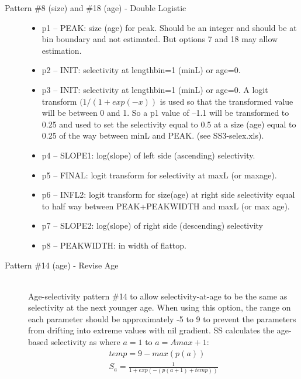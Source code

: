 \begin{description}
	\item[Pattern \#8 (size) and \#18 (age) - Double Logistic]\hfil
	\begin{itemize}
		\item  p1 – PEAK:  size (age) for peak. Should be an integer and should be at bin boundary and not estimated.  But options 7 and 18 may allow estimation.
		\item p2 – INIT:  selectivity at lengthbin=1 (minL) or age=0.
		\item p3 – INIT:  selectivity at lengthbin=1 (minL) or age=0. A logit transform $(1/(1+exp(-x))$ is used so that the transformed value will be between 0 and 1.  So a p1 value of –1.1 will be transformed to 0.25 and used to set the selectivity equal to 0.5 at a size (age) equal to 0.25 of the way between minL and PEAK.  (see SS3-selex.xls).
		\item p4 – SLOPE1:  log(slope) of left side (ascending) selectivity.
		\item p5 – FINAL:  logit transform for selectivity at maxL (or maxage).
		\item p6 – INFL2:  logit transform for size(age) at right side selectivity equal to half way between PEAK+PEAKWIDTH and maxL (or max age).
		\item p7 – SLOPE2:  log(slope) of right side (descending) selectivity
		\item p8 – PEAKWIDTH:  in width of flattop.
	\end{itemize}
\end{description}

\begin{description}
	\item[Pattern \#14 (age) - Revise Age]\hfil\\
	Age-selectivity pattern \#14 to allow selectivity-at-age to be the same as selectivity at the next younger age.  When using this option, the range on each parameter should be approximately -5 to 9 to prevent the parameters from drifting into extreme values with nil gradient. SS calculates the age-based selectivity as where $a = 1$ to $a = Amax + 1$:
	\begin{equation}
		 \begin{split}
		 temp = 9 - max(p(a))\\
		S_a = \frac{1}{1+exp(-(p(a+1) + temp))}
		\end{split}
	\end{equation}	
\end{description}

